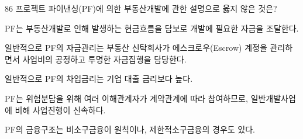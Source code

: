 \begin{question}{86}
프로젝트 파이낸싱(PF)에 의한 부동산개발에 관한 설명으로 옳지 않은 것은?
\begin{choices}
  \item PF는 부동산개발로 인해 발생하는 현금흐름을 담보로 개발에 필요한 자금을 조달한다.
  \item 일반적으로 PF의 자금관리는 부동산 신탁회사가 에스크로우(Escrow) 계정을 관리하면서 사업비의 공정하고 투명한 자금집행을 담당한다.
  \item 일반적으로 PF의 차입금리는 기업 대출 금리보다 높다.
  \item PF는 위험분담을 위해 여러 이해관계자가 계약관계에 따라 참여하므로, 일반개발사업에 비해 사업진행이 신속하다.
  \item PF의 금융구조는 비소구금융이 원칙이나, 제한적소구금융의 경우도 있다.
\end{choices}
\end{question}
